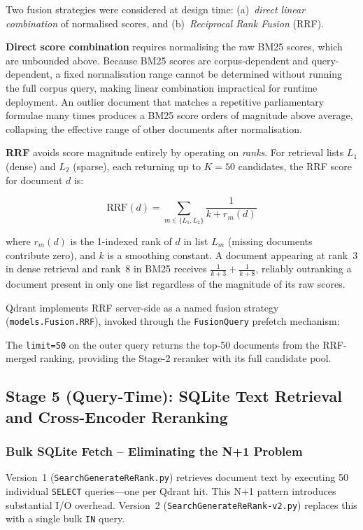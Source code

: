 \documentclass[conference]{IEEEtran}
\begin{document}
Two fusion strategies were considered at design time: (a)~\emph{direct linear
combination} of normalised scores, and (b)~\emph{Reciprocal Rank Fusion}
(RRF).

\textbf{Direct score combination} requires normalising the raw BM25 scores,
which are unbounded above.
Because BM25 scores are corpus-dependent and query-dependent, a fixed
normalisation range cannot be determined without running the full corpus
query, making linear combination impractical for runtime deployment.
An outlier document that matches a repetitive parliamentary formulae many times
produces a BM25 score orders of magnitude above average, collapsing the
effective range of other documents after normalisation.

\textbf{RRF} avoids score magnitude entirely by operating on \emph{ranks}.
For retrieval lists $L_1$ (dense) and $L_2$ (sparse), each returning up to
$K=50$ candidates, the RRF score for document $d$ is:

\begin{equation}
  \text{RRF}(d) = \sum_{m \in \{L_1, L_2\}} \frac{1}{k + r_m(d)}
  \label{eq:rrf}
\end{equation}

\noindent where $r_m(d)$ is the 1-indexed rank of $d$ in list $L_m$ (missing
documents contribute zero), and $k$ is a smoothing constant.
A document appearing at rank~3 in dense retrieval and rank~8 in BM25 receives
$\frac{1}{k+3}+\frac{1}{k+8}$, reliably outranking a document present in only
one list regardless of the magnitude of its raw scores.

Qdrant implements RRF server-side as a named fusion strategy
(\texttt{models.Fusion.RRF}), invoked through the \texttt{FusionQuery}
prefetch mechanism:

The \texttt{limit=50} on the outer query returns the top-50 documents from
the RRF-merged ranking, providing the Stage-2 reranker with its full
candidate pool.

\subsection{Stage 5 (Query-Time): SQLite Text Retrieval and Cross-Encoder Reranking}
\label{sec:stage2}

\subsubsection{Bulk SQLite Fetch -- Eliminating the N+1 Problem}

Version~1 (\texttt{SearchGenerateReRank.py}) retrieves document text by
executing 50 individual \texttt{SELECT} queries---one per Qdrant hit.
This N+1 pattern introduces substantial I/O overhead.
Version~2 (\texttt{SearchGenerateReRank-v2.py}) replaces this with a single
bulk \texttt{IN} query.
\end{document}
